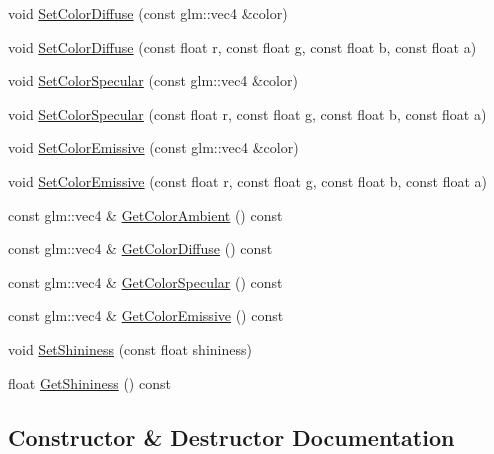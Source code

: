 \begin{DoxyCompactItemize}
\item 
void \mbox{\hyperlink{classec_1_1_material_a7ce5e2fb141bc7901233cc1c37c2a99e}{Set\+Color\+Diffuse}} (const glm\+::vec4 \&color)
\item 
void \mbox{\hyperlink{classec_1_1_material_a62a19bc4ff8b910f46bd55742278635c}{Set\+Color\+Diffuse}} (const float r, const float g, const float b, const float a)
\item 
void \mbox{\hyperlink{classec_1_1_material_a29e7a680db69d979f7618e20be432bcf}{Set\+Color\+Specular}} (const glm\+::vec4 \&color)
\item 
void \mbox{\hyperlink{classec_1_1_material_a319ff4ce4891d712c0d49797004d3848}{Set\+Color\+Specular}} (const float r, const float g, const float b, const float a)
\item 
void \mbox{\hyperlink{classec_1_1_material_a41ddcc1dacc6efff88a724af210e92b9}{Set\+Color\+Emissive}} (const glm\+::vec4 \&color)
\item 
void \mbox{\hyperlink{classec_1_1_material_a0f316b080d79ff56f366499e97daf22c}{Set\+Color\+Emissive}} (const float r, const float g, const float b, const float a)
\item 
const glm\+::vec4 \& \mbox{\hyperlink{classec_1_1_material_a1d2b8ebe3ea664d8fa17868f2ca2a397}{Get\+Color\+Ambient}} () const
\item 
const glm\+::vec4 \& \mbox{\hyperlink{classec_1_1_material_afe0745114f9fa1cae980396685669073}{Get\+Color\+Diffuse}} () const
\item 
const glm\+::vec4 \& \mbox{\hyperlink{classec_1_1_material_aab38aa7a5689a647fe10287c6b97d54d}{Get\+Color\+Specular}} () const
\item 
const glm\+::vec4 \& \mbox{\hyperlink{classec_1_1_material_a01f33ac7f9bdeb7b8c2a7a44f4902c4e}{Get\+Color\+Emissive}} () const
\item 
void \mbox{\hyperlink{classec_1_1_material_a04774cb4359499583d69a22ce047f9ba}{Set\+Shininess}} (const float shininess)
\item 
float \mbox{\hyperlink{classec_1_1_material_a925c67d5ba6adfebdaec677ec3f6e2db}{Get\+Shininess}} () const
\end{DoxyCompactItemize}


\subsection{Constructor \& Destructor Documentation}
\mbox{\label{classec_1_1_material_a259d88ca352df2d284380f0b37052652}} 
